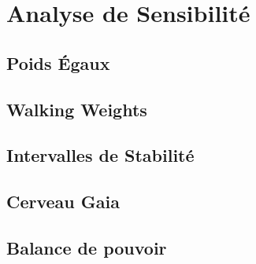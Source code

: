 \section{Analyse de Sensibilité}\label{sec:sensibilité}
\subsection{Poids Égaux}

\subsection{Walking Weights}

\subsection{Intervalles de Stabilité}\label{subsec:intstabilité}

\subsection{Cerveau Gaia}

\subsection{Balance de pouvoir}